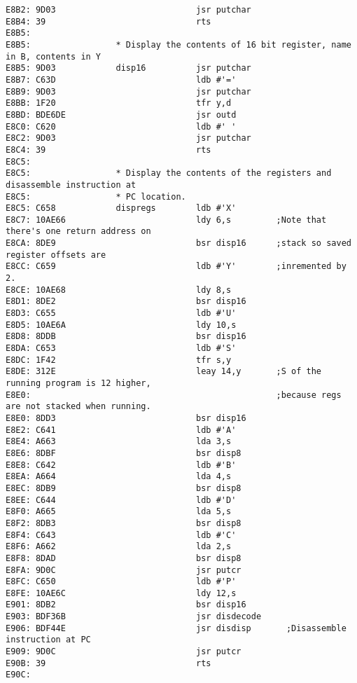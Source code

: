 {\begin{verbatim}
E8B2: 9D03                            jsr putchar
E8B4: 39                              rts
E8B5:                 
E8B5:                 * Display the contents of 16 bit register, name in B, contents in Y
E8B5: 9D03            disp16          jsr putchar
E8B7: C63D                            ldb #'='
E8B9: 9D03                            jsr putchar
E8BB: 1F20                            tfr y,d
E8BD: BDE6DE                          jsr outd
E8C0: C620                            ldb #' '
E8C2: 9D03                            jsr putchar
E8C4: 39                              rts
E8C5:                 
E8C5:                 * Display the contents of the registers and disassemble instruction at
E8C5:                 * PC location.
E8C5: C658            dispregs        ldb #'X'
E8C7: 10AE66                          ldy 6,s         ;Note that there's one return address on
E8CA: 8DE9                            bsr disp16      ;stack so saved register offsets are 
E8CC: C659                            ldb #'Y'        ;inremented by 2.
E8CE: 10AE68                          ldy 8,s
E8D1: 8DE2                            bsr disp16
E8D3: C655                            ldb #'U'
E8D5: 10AE6A                          ldy 10,s
E8D8: 8DDB                            bsr disp16
E8DA: C653                            ldb #'S'
E8DC: 1F42                            tfr s,y
E8DE: 312E                            leay 14,y       ;S of the running program is 12 higher,
E8E0:                                                 ;because regs are not stacked when running.
E8E0: 8DD3                            bsr disp16
E8E2: C641                            ldb #'A'
E8E4: A663                            lda 3,s
E8E6: 8DBF                            bsr disp8
E8E8: C642                            ldb #'B'
E8EA: A664                            lda 4,s
E8EC: 8DB9                            bsr disp8
E8EE: C644                            ldb #'D'
E8F0: A665                            lda 5,s
E8F2: 8DB3                            bsr disp8
E8F4: C643                            ldb #'C'
E8F6: A662                            lda 2,s
E8F8: 8DAD                            bsr disp8
E8FA: 9D0C                            jsr putcr
E8FC: C650                            ldb #'P'
E8FE: 10AE6C                          ldy 12,s
E901: 8DB2                            bsr disp16
E903: BDF36B                          jsr disdecode
E906: BDF44E                          jsr disdisp       ;Disassemble instruction at PC
E909: 9D0C                            jsr putcr
E90B: 39                              rts
E90C:                 

\end{verbatim}}
